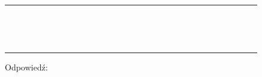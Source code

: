 \documentclass[10pt]{article}
\begin{document}
\begin{center}
\begin{tabular}{|c|c|c|c|c|c|c|c|c|c|c|c|c|c|c|c|c|c|c|c|c|c|c|c|c|c|c|c|c|c|}
\hline
 &  &  &  &  &  &  &  &  &  &  &  &  &  &  &  &  &  &  &  &  &  &  &  &  &  &  &  &  &  \\
\hline
 &  &  &  &  &  &  &  &  &  &  &  &  &  &  &  &  &  &  &  &  &  &  &  &  &  &  &  &  &  \\
\hline
 &  &  &  &  &  &  &  &  &  &  &  &  &  &  &  &  &  &  &  &  &  &  &  &  &  &  &  &  &  \\
\hline
 &  &  &  &  &  &  &  &  &  &  &  &  &  &  &  &  &  &  &  &  &  &  &  &  &  &  &  &  &  \\
\hline
 &  &  &  &  &  &  &  &  &  &  &  &  &  &  &  &  &  &  &  &  &  &  &  &  &  &  &  &  &  \\
\hline
 &  &  &  &  &  &  &  &  &  &  &  &  &  &  &  &  &  &  &  &  &  &  &  &  &  &  &  &  &  \\
\hline
 &  &  &  &  &  &  &  &  &  &  &  &  &  &  &  &  &  &  &  &  &  &  &  &  &  &  &  &  &  \\
\hline
 &  &  &  &  &  &  &  &  &  &  &  &  &  &  &  &  &  &  &  &  &  &  &  &  &  &  &  &  &  \\
\hline
 &  &  &  &  &  &  &  &  &  &  &  &  &  &  &  &  &  &  &  &  &  &  &  &  &  &  &  &  &  \\
\hline
 &  &  &  &  &  &  &  &  &  &  &  &  &  &  &  &  &  &  &  &  &  &  &  &  &  &  &  &  &  \\
\hline
 &  &  &  &  &  &  &  &  &  &  &  &  &  &  &  &  &  &  &  &  &  &  &  &  &  &  &  &  &  \\
\hline
 &  &  &  &  &  &  &  &  &  &  &  &  &  &  &  &  &  &  &  &  &  &  &  &  &  &  &  &  &  \\
\hline
 &  &  &  &  &  &  &  &  &  &  &  &  &  &  &  &  &  &  &  &  &  &  &  &  &  &  &  &  &  \\
\hline
 &  &  &  &  &  &  &  &  &  &  &  &  &  &  &  &  &  &  &  &  &  &  &  &  &  &  &  &  &  \\
\hline
 &  &  &  &  &  &  &  &  &  &  &  &  &  &  &  &  &  &  &  &  &  &  &  &  &  &  &  &  &  \\
\hline
 &  &  &  &  &  &  &  &  &  &  &  &  &  &  &  &  &  &  &  &  &  &  &  &  &  &  &  &  &  \\
\hline
\end{tabular}
\end{center}

Odpowiedź:
\end{document}
